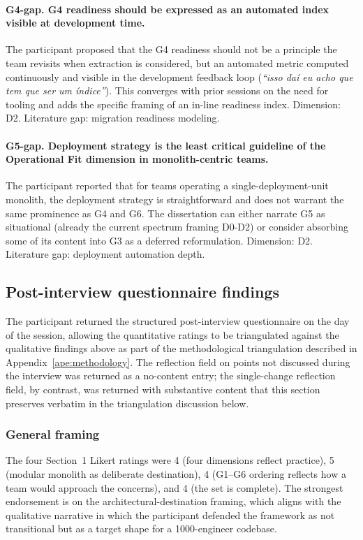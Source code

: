 \paragraph*{G4-gap. G4 readiness should be expressed as an automated index visible at development time.} The participant proposed that the G4 readiness should not be a principle the team revisits when extraction is considered, but an automated metric computed continuously and visible in the development feedback loop (\textit{``isso daí eu acho que tem que ser um índice''}). This converges with prior sessions on the need for tooling and adds the specific framing of an in-line readiness index. Dimension: D2. Literature gap: migration readiness modeling.

\paragraph*{G5-gap. Deployment strategy is the least critical guideline of the Operational Fit dimension in monolith-centric teams.} The participant reported that for teams operating a single-deployment-unit monolith, the deployment strategy is straightforward and does not warrant the same prominence as G4 and G6. The dissertation can either narrate G5 as situational (already the current spectrum framing D0-D2) or consider absorbing some of its content into G3 as a deferred reformulation. Dimension: D2. Literature gap: deployment automation depth.

\subsection*{Post-interview questionnaire findings}

The participant returned the structured post-interview questionnaire on the day of the session, allowing the quantitative ratings to be triangulated against the qualitative findings above as part of the methodological triangulation described in Appendix~\ref{ape:methodology}. The reflection field on points not discussed during the interview was returned as a no-content entry; the single-change reflection field, by contrast, was returned with substantive content that this section preserves verbatim in the triangulation discussion below.

\subsubsection*{General framing}

The four Section~1 Likert ratings were 4 (four dimensions reflect practice), 5 (modular monolith as deliberate destination), 4 (G1--G6 ordering reflects how a team would approach the concerns), and 4 (the set is complete). The strongest endorsement is on the architectural-destination framing, which aligns with the qualitative narrative in which the participant defended the framework as not transitional but as a target shape for a 1000-engineer codebase.

